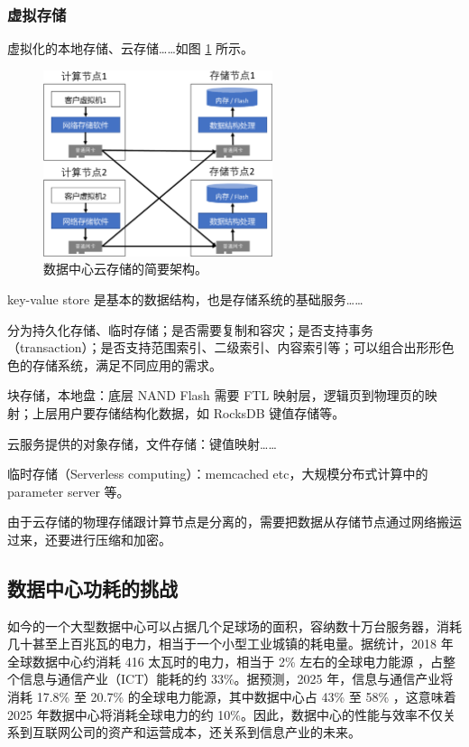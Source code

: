 \subsubsection{虚拟存储}


虚拟化的本地存储、云存储……如图 \ref{background:fig:storage_arch} 所示。

\begin{figure}[htbp]
	\centering
	\includegraphics[width=0.6\textwidth]{figures/storage_arch.pdf}
	\caption{数据中心云存储的简要架构。}
	\label{background:fig:storage_arch}
\end{figure}

key-value store 是基本的数据结构，也是存储系统的基础服务……

分为持久化存储、临时存储；是否需要复制和容灾；是否支持事务（transaction）；是否支持范围索引、二级索引、内容索引等；可以组合出形形色色的存储系统，满足不同应用的需求。

块存储，本地盘：底层 NAND Flash 需要 FTL 映射层，逻辑页到物理页的映射；上层用户要存储结构化数据，如 RocksDB 键值存储等。

云服务提供的对象存储，文件存储：键值映射……

临时存储（Serverless computing）：memcached etc，大规模分布式计算中的 parameter server 等。

由于云存储的物理存储跟计算节点是分离的，需要把数据从存储节点通过网络搬运过来，还要进行压缩和加密。




\subsection{数据中心功耗的挑战}

如今的一个大型数据中心可以占据几个足球场的面积，容纳数十万台服务器，消耗几十甚至上百兆瓦的电力，相当于一个小型工业城镇的耗电量。据统计，2018 年全球数据中心约消耗 416 太瓦时的电力，相当于 2\% 左右的全球电力能源 \cite{datacenter-energy}，占整个信息与通信产业（ICT）能耗的约 33\%。据预测，2025 年，信息与通信产业将消耗 17.8\% 至 20.7\% 的全球电力能源，其中数据中心占 43\% 至 58\% \cite{power-consumption}，这意味着 2025 年数据中心将消耗全球电力的约 10\%。因此，数据中心的性能与效率不仅关系到互联网公司的资产和运营成本，还关系到信息产业的未来。

